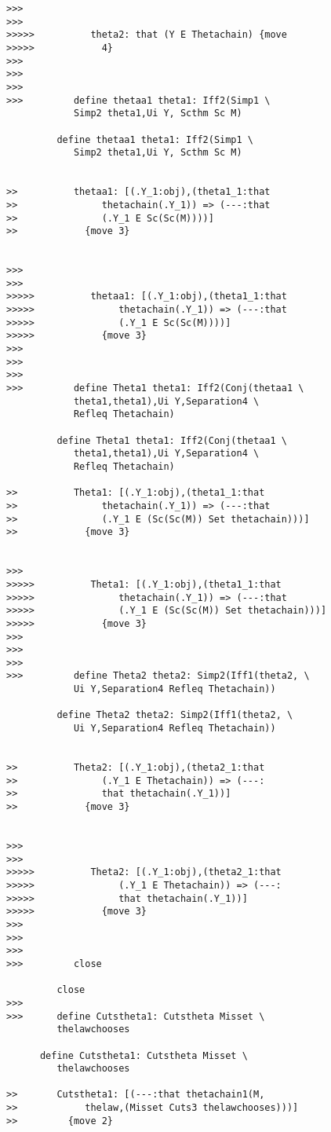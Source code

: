\documentclass[12pt]{article}
\begin{document}
\begin{verbatim}
>>>
>>>
>>>>>          theta2: that (Y E Thetachain) {move
>>>>>            4}
>>>
>>>
>>>
>>>         define thetaa1 theta1: Iff2(Simp1 \
            Simp2 theta1,Ui Y, Scthm Sc M)

         define thetaa1 theta1: Iff2(Simp1 \
            Simp2 theta1,Ui Y, Scthm Sc M)


>>          thetaa1: [(.Y_1:obj),(theta1_1:that
>>               thetachain(.Y_1)) => (---:that
>>               (.Y_1 E Sc(Sc(M))))]
>>            {move 3}


>>>
>>>
>>>>>          thetaa1: [(.Y_1:obj),(theta1_1:that
>>>>>               thetachain(.Y_1)) => (---:that
>>>>>               (.Y_1 E Sc(Sc(M))))]
>>>>>            {move 3}
>>>
>>>
>>>
>>>         define Theta1 theta1: Iff2(Conj(thetaa1 \
            theta1,theta1),Ui Y,Separation4 \
            Refleq Thetachain)

         define Theta1 theta1: Iff2(Conj(thetaa1 \
            theta1,theta1),Ui Y,Separation4 \
            Refleq Thetachain)

>>          Theta1: [(.Y_1:obj),(theta1_1:that
>>               thetachain(.Y_1)) => (---:that
>>               (.Y_1 E (Sc(Sc(M)) Set thetachain)))]
>>            {move 3}


>>>
>>>>>          Theta1: [(.Y_1:obj),(theta1_1:that
>>>>>               thetachain(.Y_1)) => (---:that
>>>>>               (.Y_1 E (Sc(Sc(M)) Set thetachain)))]
>>>>>            {move 3}
>>>
>>>
>>>
>>>         define Theta2 theta2: Simp2(Iff1(theta2, \
            Ui Y,Separation4 Refleq Thetachain))

         define Theta2 theta2: Simp2(Iff1(theta2, \
            Ui Y,Separation4 Refleq Thetachain))


>>          Theta2: [(.Y_1:obj),(theta2_1:that
>>               (.Y_1 E Thetachain)) => (---:
>>               that thetachain(.Y_1))]
>>            {move 3}


>>>
>>>
>>>>>          Theta2: [(.Y_1:obj),(theta2_1:that
>>>>>               (.Y_1 E Thetachain)) => (---:
>>>>>               that thetachain(.Y_1))]
>>>>>            {move 3}
>>>
>>>
>>>
>>>         close

         close
>>>
>>>      define Cutstheta1: Cutstheta Misset \
         thelawchooses

      define Cutstheta1: Cutstheta Misset \
         thelawchooses

>>       Cutstheta1: [(---:that thetachain1(M,
>>            thelaw,(Misset Cuts3 thelawchooses)))]
>>         {move 2}



\end{verbatim}
\end{document}
